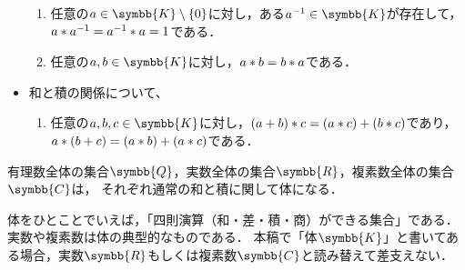 \documentclass[../sotsu.tex]{subfiles}
\begin{document}
\begin{definition}[体]
\begin{itemize}
\begin{enumerate}[resume]
            \item \label{field:prod-reciprocal} 任意の$a \in \symbb{K} \setminus \{0\}$に対し，ある$a^{-1} \in \symbb{K}$が存在して，$a \mathbin{\ast} a^{-1} = a^{-1} \mathbin{\ast} a = 1$である．
            \item \label{field:prod-commutative} 任意の$a, b \in \symbb{K}$に対し，$a \mathbin{\ast} b = b \mathbin{\ast} a$である．
        \end{enumerate}
        \item 和と積の関係について、
        \begin{enumerate}[resume]
            \item \label{field:distributive} 任意の$a, b, c \in \symbb{K}$に対し，$(a + b) \mathbin{\ast} c = (a \mathbin{\ast} c) + (b \mathbin{\ast} c)$であり，$a \mathbin{\ast} (b + c) = (a \mathbin{\ast} b) + (a \mathbin{\ast} c)$である．
        \end{enumerate}    
    \end{itemize}
\end{definition}

\begin{example}
    有理数全体の集合$\symbb{Q}$，実数全体の集合$\symbb{R}$，複素数全体の集合$\symbb{C}$は，
    それぞれ通常の和と積に関して体になる．
\end{example}

体をひとことでいえば，「四則演算（和・差・積・商）ができる集合」である．
実数や複素数は体の典型的なものである．
本稿で「体$\symbb{K}$」と書いてある場合，実数$\symbb{R}$もしくは複素数$\symbb{C}$と読み替えて差支えない．
\end{document}
